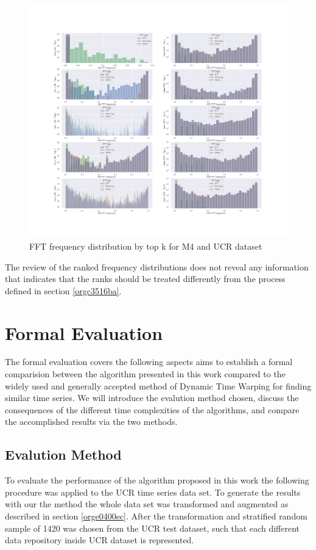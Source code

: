 \documentclass[phd,black, hidelinks]{PrincetonThesis}
\begin{document}
\begin{figure}[htbp]
\centering
\includegraphics[width=.9\linewidth]{./img/fft_freq_topk.png}
\caption{\label{fig:org67cf7ce}FFT frequency distribution by top k for M4 and UCR dataset}
\end{figure}

The review of the ranked frequency distributions does not reveal any information that indicates that the ranks should be treated differently from the process defined in section \ref{orgc3516ba}.

\chapter{Formal Evaluation}
\label{sec:org0b7c0b6}
The formal evaluation covers the following aspects aims to establish a formal comparision between the algorithm presented in this work compared to the widely used and generally accepted method of Dynamic Time Warping for finding similar time series. We will introduce the evalution method chosen, discuss the consequences of the different time complexities of the algorithms, and compare the accomplished results via the two methods.

\section{Evalution Method}
\label{sec:org87ab00a}
To evaluate the performance of the algorithm proposed in this work the following procedure was applied to the UCR time series data set. To generate the results with our the method the whole data set was transformed and augmented as described in section \ref{orge0400ec}. After the transformation and stratified random sample of 1420 was chosen from the UCR test dataset, such that each different data repository inside UCR dataset is represented.
\end{document}
